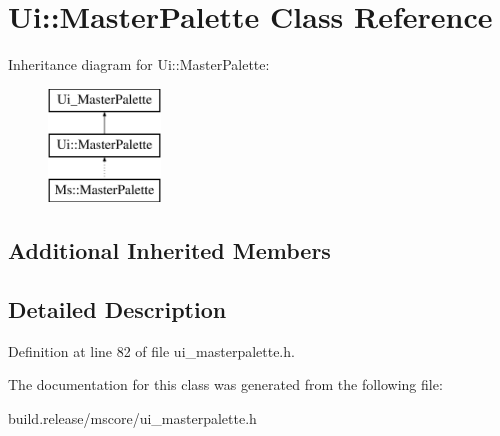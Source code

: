 \hypertarget{class_ui_1_1_master_palette}{}\section{Ui\+:\+:Master\+Palette Class Reference}
\label{class_ui_1_1_master_palette}
Inheritance diagram for Ui\+:\+:Master\+Palette\+:\begin{figure}[H]
\begin{center}
\leavevmode
\includegraphics[height=3.000000cm]{class_ui_1_1_master_palette}
\end{center}
\end{figure}
\subsection*{Additional Inherited Members}


\subsection{Detailed Description}


Definition at line 82 of file ui\+\_\+masterpalette.\+h.



The documentation for this class was generated from the following file\+:\begin{DoxyCompactItemize}
\item 
build.\+release/mscore/ui\+\_\+masterpalette.\+h\end{DoxyCompactItemize}
